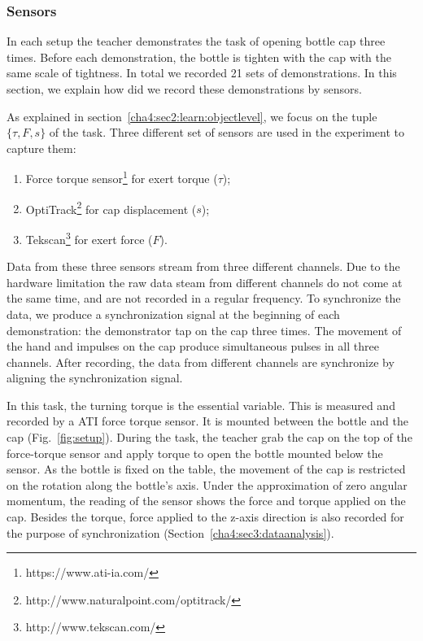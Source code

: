 \subsubsection{Sensors}
\label{cha4:sec3:experimentsetup:sensor}
In each setup the teacher demonstrates the task of opening bottle cap three times. Before each demonstration, the bottle is tighten with the cap with the same scale of tightness. In total we recorded 21 sets of demonstrations. In this section, we explain how did we record these demonstrations by sensors.



As explained in section~\ref{cha4:sec2:learn:objectlevel}, we focus on the tuple $\{\tau,F,s\}$ of the task. Three different set of sensors are used in the experiment to capture them:

\begin{enumerate}
\item Force torque sensor\footnote{https://www.ati-ia.com/} for exert torque ($\tau$);
\item OptiTrack\footnote{http://www.naturalpoint.com/optitrack/} for cap displacement ($s$);
\item Tekscan\footnote{http://www.tekscan.com/} for exert force ($F$).
\end{enumerate}

Data from these three sensors stream from three different channels. Due to the hardware limitation the raw data steam from different channels do not come at the same time, and are not recorded in a regular frequency. To synchronize the data, we produce a synchronization signal at the beginning of each demonstration: the demonstrator tap on the cap three times. The movement of the hand and impulses on the cap produce simultaneous pulses in all three channels. After recording, the data from different channels are synchronize by aligning the synchronization signal.

In this task, the turning torque is the essential variable. This is measured and recorded by a ATI force torque sensor. It is mounted between the bottle and the cap (Fig.~\ref{fig:setup}). During the task, the teacher grab the cap on the top of the force-torque sensor and apply torque to open the bottle mounted below the sensor. As the bottle is fixed on the table, the movement of the cap is restricted on the rotation along the bottle's axis. Under the approximation of zero angular momentum, the reading of the sensor shows the force and torque applied on the cap. Besides the torque, force applied to the z-axis direction is also recorded for the purpose of synchronization (Section~\ref{cha4:sec3:dataanalysis}).

